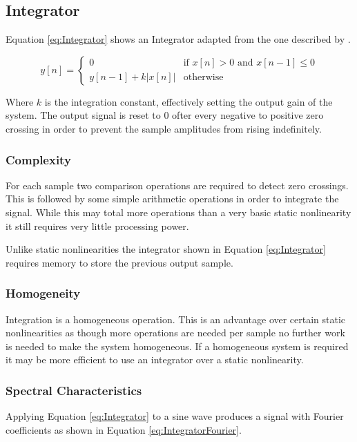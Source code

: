 
	\subsection{Integrator}
	\label{sec:Excitation-Integrator}
		Equation \ref{eq:Integrator} shows an Integrator adapted from the one described by \citet{larsen2004audio}.

		\begin{equation}
			y[n] = \begin{cases}
				0 & \text{if $x[n] > 0$ and $x[n - 1] \leq 0$} \\
				y[n - 1] + k|x[n]| & \text{otherwise}
			\end{cases}
			\label{eq:Integrator}
		\end{equation}

		Where $k$ is the integration constant, effectively setting the output gain of the system. The output signal
		is reset to 0 ofter every negative to positive zero crossing in order to prevent the sample amplitudes from
		rising indefinitely.

		\subsubsection*{Complexity}
			For each sample two comparison operations are required to detect zero crossings. This is followed
			by some simple arithmetic operations in order to integrate the signal. While this may total more
			operations than a very basic static nonlinearity it still requires very little processing power.

			Unlike static nonlinearities the integrator shown in Equation \ref{eq:Integrator} requires memory
			to store the previous output sample. 

		\subsubsection*{Homogeneity}
			Integration is a homogeneous operation. This is an advantage over certain static nonlinearities as
			though more operations are needed per sample no further work is needed to make the system
			homogeneous. If a homogeneous system is required it may be more efficient to use an integrator over
			a static nonlinearity.
		
		\subsubsection*{Spectral Characteristics}
			Applying Equation \ref{eq:Integrator} to a sine wave produces a signal with Fourier coefficients as
			shown in Equation \ref{eq:IntegratorFourier}.

